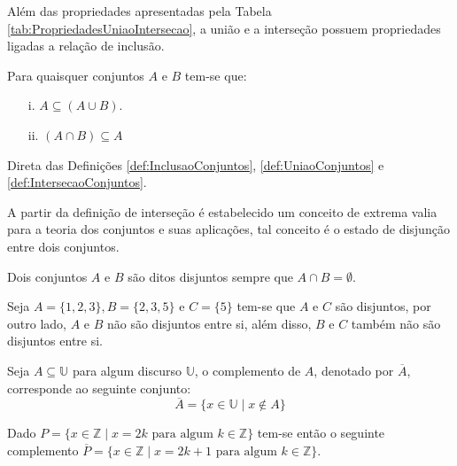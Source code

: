Além das propriedades apresentadas pela Tabela \ref{tab:PropriedadesUniaoIntersecao}, a união e a interseção possuem propriedades ligadas a relação de inclusão.

\begin{teorema}\label{teo:MonotonicidadeDaUniaoIntersecao}
	Para quaisquer conjuntos $A$ e $B$ tem-se que:
	\begin{itemize}
		\item[i.] $A \subseteq (A \cup B)$.
		\item[ii.] $(A \cap B) \subseteq A$
	\end{itemize}
\end{teorema}

\begin{prova}
	Direta das Definições \ref{def:InclusaoConjuntos}, \ref{def:UniaoConjuntos} e \ref{def:IntersecaoConjuntos}.
\end{prova}

A partir da definição de interseção é estabelecido um conceito de extrema valia para a teoria dos conjuntos e suas aplicações, tal conceito é o estado de disjunção entre dois conjuntos.

\begin{definicao}\label{def:ConjuntosDisjuntos}
	Dois conjuntos $A$ e $B$ são ditos disjuntos sempre que $A \cap B = \emptyset$.
\end{definicao}

\begin{exemplo}\label{exe:ConjuntosDisjuntos}
	Seja $A = \{1, 2, 3\}, B = \{2, 3, 5\}$ e $C = \{5\}$ tem-se que $A$ e $C$ são disjuntos, por outro lado, $A$ e $B$ não são disjuntos entre si, além disso, $B$ e $C$ também não são disjuntos entre si.
\end{exemplo}

\begin{definicao}\label{def:ComplementoConjuntos}
	Seja $A \subseteq \mathbb{U}$ para algum discurso $\mathbb{U}$, o complemento de $A$, denotado por $\overline{A}$, corresponde ao seguinte conjunto:
	$$\overline{A} = \{x \in \mathbb{U} \mid x \notin A\}$$
\end{definicao}

\begin{exemplo}\label{exe:ComplementoConjuntos1}
	Dado $P = \{ x \in \mathbb{Z} \mid x = 2k \mbox{ para algum } k \in \mathbb{Z}\}$ tem-se então o seguinte complemento $\overline{P} = \{ x \in \mathbb{Z} \mid x = 2k + 1 \mbox{ para algum } k \in \mathbb{Z}\}$.
\end{exemplo}

